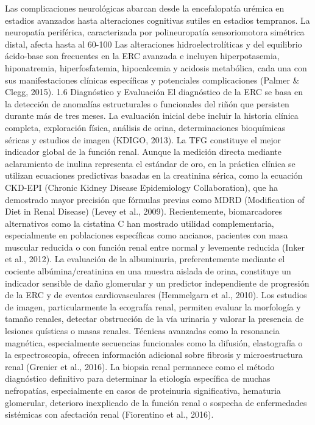 \documentclass{article}
\begin{document}
\begin{multicols}{2}
Las complicaciones neurológicas abarcan desde la encefalopatía urémica en estadios avanzados hasta alteraciones cognitivas sutiles en estadios tempranos. La neuropatía periférica, caracterizada por polineuropatía sensoriomotora simétrica distal, afecta hasta al 60-100%
Las alteraciones hidroelectrolíticas y del equilibrio ácido-base son frecuentes en la ERC avanzada e incluyen hiperpotasemia, hiponatremia, hiperfosfatemia, hipocalcemia y acidosis metabólica, cada una con sus manifestaciones clínicas específicas y potenciales complicaciones (Palmer \& Clegg, 2015).
 1.6 Diagnóstico y Evaluación
El diagnóstico de la ERC se basa en la detección de anomalías estructurales o funcionales del riñón que persisten durante más de tres meses. La evaluación inicial debe incluir la historia clínica completa, exploración física, análisis de orina, determinaciones bioquímicas séricas y estudios de imagen (KDIGO, 2013).
La TFG constituye el mejor indicador global de la función renal. Aunque la medición directa mediante aclaramiento de inulina representa el estándar de oro, en la práctica clínica se utilizan ecuaciones predictivas basadas en la creatinina sérica, como la ecuación CKD-EPI (Chronic Kidney Disease Epidemiology Collaboration), que ha demostrado mayor precisión que fórmulas previas como MDRD (Modification of Diet in Renal Disease) (Levey et al., 2009). Recientemente, biomarcadores alternativos como la cistatina C han mostrado utilidad complementaria, especialmente en poblaciones específicas como ancianos, pacientes con masa muscular reducida o con función renal entre normal y levemente reducida (Inker et al., 2012).
La evaluación de la albuminuria, preferentemente mediante el cociente albúmina/creatinina en una muestra aislada de orina, constituye un indicador sensible de daño glomerular y un predictor independiente de progresión de la ERC y de eventos cardiovasculares (Hemmelgarn et al., 2010).
Los estudios de imagen, particularmente la ecografía renal, permiten evaluar la morfología y tamaño renales, detectar obstrucción de la vía urinaria y valorar la presencia de lesiones quísticas o masas renales. Técnicas avanzadas como la resonancia magnética, especialmente secuencias funcionales como la difusión, elastografía o la espectroscopia, ofrecen información adicional sobre fibrosis y microestructura renal (Grenier et al., 2016).
La biopsia renal permanece como el método diagnóstico definitivo para determinar la etiología específica de muchas nefropatías, especialmente en casos de proteinuria significativa, hematuria glomerular, deterioro inexplicado de la función renal o sospecha de enfermedades sistémicas con afectación renal (Fiorentino et al., 2016).

\end{multicols}
\end{document}
